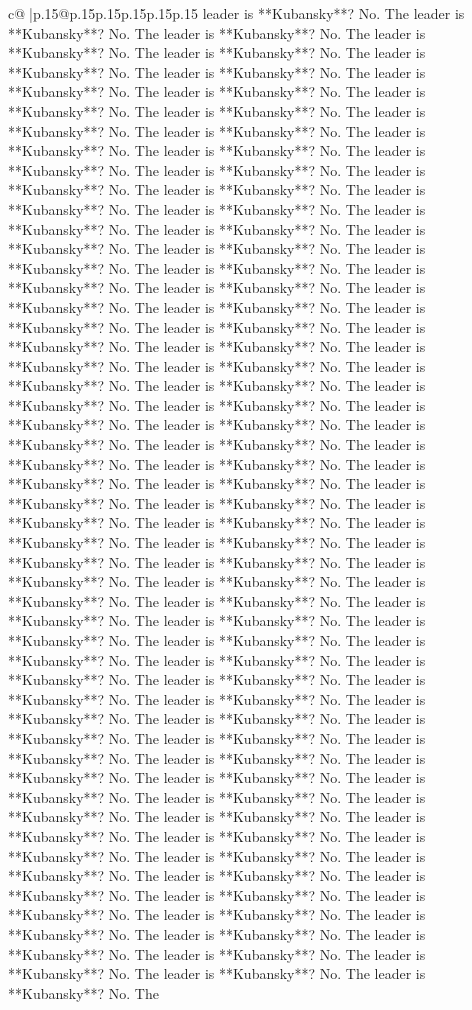 \documentclass{article}
\begin{document}
{\begin{supertabular}{c@{$\;$}|p{.15\linewidth}@{}p{.15\linewidth}p{.15\linewidth}p{.15\linewidth}p{.15\linewidth}p{.15\linewidth}}
{{{leader is **Kubansky**? No. The leader is **Kubansky**? No. The leader is **Kubansky**? No. The leader is **Kubansky**? No. The leader is **Kubansky**? No. The leader is **Kubansky**? No. The leader is **Kubansky**? No. The leader is **Kubansky**? No. The leader is **Kubansky**? No. The leader is **Kubansky**? No. The leader is **Kubansky**? No. The leader is **Kubansky**? No. The leader is **Kubansky**? No. The leader is **Kubansky**? No. The leader is **Kubansky**? No. The leader is **Kubansky**? No. The leader is **Kubansky**? No. The leader is **Kubansky**? No. The leader is **Kubansky**? No. The leader is **Kubansky**? No. The leader is **Kubansky**? No. The leader is **Kubansky**? No. The leader is **Kubansky**? No. The leader is **Kubansky**? No. The leader is **Kubansky**? No. The leader is **Kubansky**? No. The leader is **Kubansky**? No. The leader is **Kubansky**? No. The leader is **Kubansky**? No. The leader is **Kubansky**? No. The leader is **Kubansky**? No. The leader is **Kubansky**? No. The leader is **Kubansky**? No. The leader is **Kubansky**? No. The leader is **Kubansky**? No. The leader is **Kubansky**? No. The leader is **Kubansky**? No. The leader is **Kubansky**? No. The leader is **Kubansky**? No. The leader is **Kubansky**? No. The leader is **Kubansky**? No. The leader is **Kubansky**? No. The leader is **Kubansky**? No. The leader is **Kubansky**? No. The leader is **Kubansky**? No. The leader is **Kubansky**? No. The leader is **Kubansky**? No. The leader is **Kubansky**? No. The leader is **Kubansky**? No. The leader is **Kubansky**? No. The leader is **Kubansky**? No. The leader is **Kubansky**? No. The leader is **Kubansky**? No. The leader is **Kubansky**? No. The leader is **Kubansky**? No. The leader is **Kubansky**? No. The leader is **Kubansky**? No. The leader is **Kubansky**? No. The leader is **Kubansky**? No. The leader is **Kubansky**? No. The leader is **Kubansky**? No. The leader is **Kubansky**? No. The leader is **Kubansky**? No. The leader is **Kubansky**? No. The leader is **Kubansky**? No. The leader is **Kubansky**? No. The leader is **Kubansky**? No. The leader is **Kubansky**? No. The leader is **Kubansky**? No. The leader is **Kubansky**? No. The leader is **Kubansky**? No. The leader is **Kubansky**? No. The leader is **Kubansky**? No. The leader is **Kubansky**? No. The leader is **Kubansky**? No. The leader is **Kubansky**? No. The leader is **Kubansky**? No. The leader is **Kubansky**? No. The leader is **Kubansky**? No. The leader is **Kubansky**? No. The leader is **Kubansky**? No. The leader is **Kubansky**? No. The leader is **Kubansky**? No. The leader is **Kubansky**? No. The leader is **Kubansky**? No. The leader is **Kubansky**? No. The leader is **Kubansky**? No. The leader is **Kubansky**? No. The leader is **Kubansky**? No. The leader is **Kubansky**? No. The leader is **Kubansky**? No. The leader is **Kubansky**? No. The leader is **Kubansky**? No. The leader is **Kubansky**? No. The leader is **Kubansky**? No. The leader is **Kubansky**? No. The leader is **Kubansky**? No. The leader is **Kubansky**? No. The leader is **Kubansky**? No. The leader is **Kubansky**? No. The }}}
\end{supertabular}}
\end{document}
